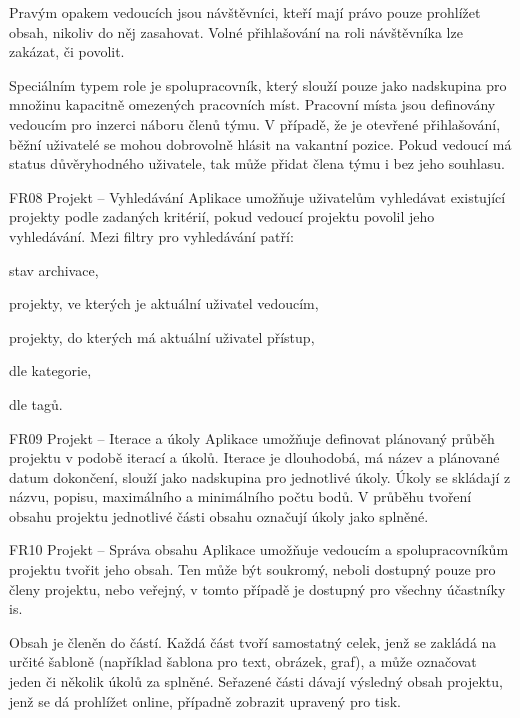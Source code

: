 \begin{dl}
   Pravým opakem vedoucích jsou návštěvníci, kteří mají právo pouze prohlížet obsah, nikoliv do něj zasahovat. Volné přihlašování na roli návštěvníka lze zakázat, či povolit.

   Speciálním typem role je spolupracovník, který slouží pouze jako nadskupina pro množinu kapacitně omezených pracovních míst. Pracovní místa jsou definovány vedoucím pro inzerci náboru členů týmu. V případě, že je otevřené přihlašování, běžní uživatelé se mohou dobrovolně hlásit na vakantní pozice. Pokud vedoucí má status důvěryhodného uživatele, tak může přidat člena týmu i bez jeho souhlasu.

   \item[FR08 Projekt -- Vyhledávání]
   Aplikace umožňuje uživatelům vyhledávat existující projekty podle zadaných kritérií, pokud vedoucí projektu povolil jeho vyhledávání. Mezi filtry pro vyhledávání patří: 

   \begin{ulnar}
      \item stav archivace, 
      \item projekty, ve kterých je aktuální uživatel vedoucím, 
      \item projekty, do kterých má aktuální uživatel přístup, 
      \item dle kategorie, 
      \item dle tagů.
   \end{ulnar}
   

   \item[FR09 Projekt -- Iterace a úkoly]
   Aplikace umožňuje definovat plánovaný průběh projektu v podobě iterací a úkolů. Iterace je dlouhodobá, má název a plánované datum dokončení, slouží jako nadskupina pro jednotlivé úkoly. Úkoly se skládají z názvu, popisu, maximálního a minimálního počtu bodů. V průběhu tvoření obsahu projektu jednotlivé části obsahu označují úkoly jako splněné.

   \item[FR10 Projekt -- Správa obsahu]
   Aplikace umožňuje vedoucím a spolupracovníkům projektu tvořit jeho obsah. Ten může být soukromý, neboli dostupný pouze pro členy projektu, nebo veřejný, v tomto případě je dostupný pro všechny účastníky \gls{is}.

   Obsah je členěn do částí. Každá část tvoří samostatný celek, jenž se zakládá na určité šabloně (například šablona pro text, obrázek, graf), a může označovat jeden či několik úkolů za splněné. Seřazené části dávají výsledný obsah projektu, jenž se dá prohlížet online, případně zobrazit upravený pro tisk.


\end{dl}
